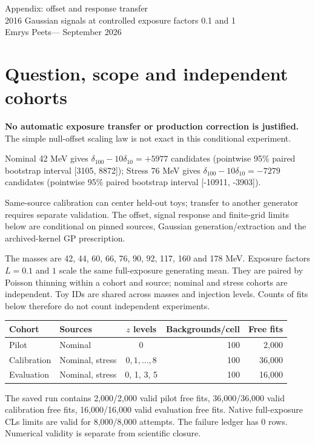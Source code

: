 \documentclass[10pt]{article}
\begin{document}
\setcounter{page}{10}
\begin{center}{\LARGE Appendix: offset and response transfer}\\[5pt]
{\large 2016 Gaussian signals at controlled exposure factors 0.1 and 1}\\[4pt]
Emrys Peets\quad--- September 2026\end{center}


\section*{Question, scope and independent cohorts}

\textbf{No automatic exposure transfer or production correction is justified.} The simple null-offset scaling law is not exact in this conditional experiment. 

Nominal 42 MeV gives $\delta_{100}-10\delta_{10}=+5977$ candidates (pointwise 95\% paired bootstrap interval [3105, 8872]); Stress 76 MeV gives $\delta_{100}-10\delta_{10}=-7279$ candidates (pointwise 95\% paired bootstrap interval [-10911, -3903]). 

Same-source calibration can center held-out toys; transfer to another generator requires separate validation. The offset, signal response and finite-grid limits below are conditional on pinned sources, Gaussian generation/extraction and the archived-kernel GP prescription.

The masses are 42, 44, 60, 66, 76, 90, 92, 117, 160 and 178 MeV. Exposure factors $L=0.1$ and $1$ scale the same full-exposure generating mean. They are paired by Poisson thinning within a cohort and source; nominal and stress cohorts are independent. Toy IDs are shared across masses and injection levels. Counts of fits below therefore do not count independent experiments.

\begin{center}\small\begin{tabular}{llcrr}\toprule
Cohort & Sources & $z$ levels & Backgrounds/cell & Free fits\\\midrule
Pilot & Nominal & 0 & 100 & 2,000\\
Calibration & Nominal, stress & $0,1,\ldots,8$ & 100 & 36,000\\
Evaluation & Nominal, stress & 0, 1, 3, 5 & 100 & 16,000\\
\bottomrule\end{tabular}\end{center}


The saved run contains 2,000/2,000 valid pilot free fits, 36,000/36,000 valid calibration free fits, 16,000/16,000 valid evaluation free fits. Native full-exposure CLs limits are valid for 8,000/8,000 attempts. The failure ledger has 0 rows. Numerical validity is separate from scientific closure.
\end{document}

